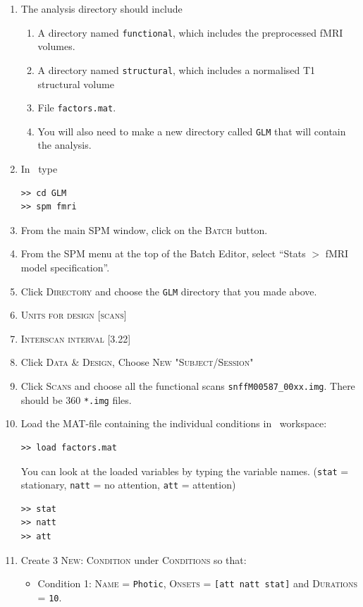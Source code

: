 \begin{enumerate}
 \item The analysis directory should include
 \begin{enumerate}
  \item A directory named \texttt{functional}, which includes the preprocessed fMRI volumes.
  \item A directory named \texttt{structural}, which includes a normalised T1 structural volume
  \item File \texttt{factors.mat}.
  \item You will also need to make a new directory called \texttt{GLM} that will contain the analysis.
 \end{enumerate}
 \item In \matlab\ type
\begin{verbatim}
>> cd GLM
>> spm fmri
\end{verbatim}
 \item From the main SPM window, click on the \textsc{Batch} button.
 \item From the SPM menu at the top of the Batch Editor, select ``Stats $>$ fMRI model specification''.
 \item Click \textsc{Directory} and choose the \texttt{GLM} directory that you made above.
 \item \textsc{Units for design} [\textsc{scans}]
 \item \textsc{Interscan interval} [3.22]
 \item Click \textsc{Data \& Design}, Choose \textsc{New "Subject/Session"}
 \item Click \textsc{Scans} and choose all the functional scans \texttt{snffM00587\_00xx.img}. There should be 360 \texttt{*.img} files.
 \item Load the MAT-file containing the individual conditions in \matlab\ workspace:
\begin{verbatim}
>> load factors.mat
\end{verbatim}
You can look at the loaded variables by typing the variable names.
(\texttt{stat} = stationary, \texttt{natt} = no attention, \texttt{att} = attention)
\begin{verbatim}
>> stat
>> natt
>> att
\end{verbatim}
 \item Create 3 \textsc{New: Condition} under \textsc{Conditions} so that:
 \begin{itemize}
  \item Condition 1: \textsc{Name} = \texttt{Photic}, \textsc{Onsets} = \texttt{[att natt stat]} and \textsc{Durations} = \texttt{10}.

\end{itemize}
\end{enumerate}
